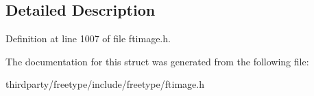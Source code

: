 \subsection{Detailed Description}


Definition at line 1007 of file ftimage.\+h.



The documentation for this struct was generated from the following file\+:\begin{DoxyCompactItemize}
\item 
thirdparty/freetype/include/freetype/ftimage.\+h\end{DoxyCompactItemize}
